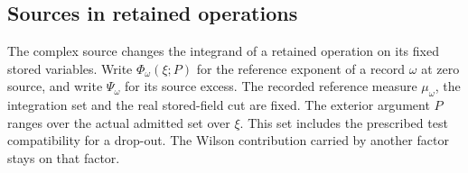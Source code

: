 \documentclass[11pt,letterpaper,reqno]{amsart}
\numberwithin{equation}{section}
\theoremstyle{definition}
\theoremstyle{remark}
\begin{document}
\subsection{Sources in retained operations}
\label{si:subsec-retained-source}

The complex source changes the integrand of a retained operation on
its fixed stored variables. Write $\Phi_\omega(\xi;P)$ for the
reference exponent of a record $\omega$ at zero source, and write
$\Psi_\omega$ for its source excess. The recorded reference measure
$\mu_\omega$, the integration set and the real stored-field cut are
fixed. The exterior argument $P$ ranges over the actual admitted
set over $\xi$. This set includes the prescribed test compatibility
for a drop-out. The Wilson contribution carried by another factor
stays on that factor.
\end{document}
